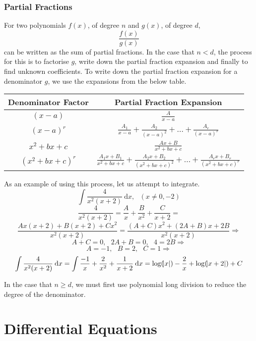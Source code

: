 \documentclass[12pt]{report}
\newcommand{\dx}{\:\mathrm{d}x}
\newcommand{\mcom}{, \:\:\:}
\begin{document}
\begin{flushleft}
\subsubsection*{Partial Fractions}

For two polynomials \(f(x)\), of degree \(n\) and \(g(x)\), of degree \(d\),
\[\frac{f(x)}{g(x)}\]
can be written as the sum of partial fractions. In the case that \(n < d\), the
process for this is to factorise \(g\), write down the partial fraction
expansion and finally to find unknown coefficients. To write down the partial
fraction expansion for a denominator \(g\), we use the expansions from the
below table.

\renewcommand{\arraystretch}{2}
\begin{center}    
    \begin{tabular}{||c|c||}
        Denominator Factor & Partial Fraction Expansion \\
        \hline
        \hline
        \((x - a)\) & \(\frac{A}{x - a}\) \\
        \((x - a)^r\) & \(\frac{A_1}{x - a} + \frac{A_2}{(x - a)^2} + \ldots +
        \frac{A_r}{(x - a)^r}\) \\
        \(x^2 + bx + c\) & \(\frac{Ax + B}{x^2 + bx + c}\) \\
        \((x^2 + bx + c)^r\) & \(\frac{A_1x + B_1}{x^2 + bx + c} +
        \frac{A_2x + B_2}{(x^2 + bx + c)^2} + \ldots 
        + \frac{A_rx + B_r}{(x^2 + bx + c)^r}\) \\
    \end{tabular}
\end{center}
\renewcommand{\arraystretch}{1}

As an example of using this process, let us attempt to integrate.
\[\int \frac{4}{x^2(x + 2)} \dx\mcom (x\neq0, -2)\]
\[\frac{4}{x^2(x + 2)} = \frac{A}{x} + \frac{B}{x^2} + \frac{C}{x + 2} = \]
\[\frac{Ax(x + 2) + B(x + 2) + Cx^2}{x^2(x + 2)}
= \frac{(A + C)x^2 + (2A + B)x + 2B}{x^2(x + 2)} \Rightarrow\]
\[A + C = 0 \mcom 2A + B = 0 \mcom 4 = 2B \Rightarrow\]
\[A = -1 \mcom B = 2 \mcom C = 1 \Rightarrow\]
\[\int \frac{4}{x^2(x + 2)} \dx = \int \frac{-1}{x} + \frac{2}{x^2} + 
\frac{1}{x + 2} \dx = \log(\abs{x}) - \frac{2}{x} + \log(\abs{x + 2}) + C\]

In the case that \(n \geq d\), we must first use polynomial long division to
reduce the degree of the denominator.

\section*{Differential Equations}


\end{flushleft}
\end{document}
